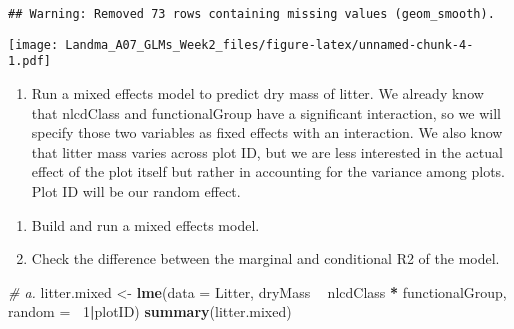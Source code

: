 \documentclass[]{article}
\newenvironment{Shaded}{\begin{snugshade}}{\end{snugshade}}
\newcommand{\CommentTok}[1]{\textcolor[rgb]{0.56,0.35,0.01}{\textit{#1}}}
\newcommand{\DataTypeTok}[1]{\textcolor[rgb]{0.13,0.29,0.53}{#1}}
\newcommand{\DecValTok}[1]{\textcolor[rgb]{0.00,0.00,0.81}{#1}}
\newcommand{\KeywordTok}[1]{\textcolor[rgb]{0.13,0.29,0.53}{\textbf{#1}}}
\newcommand{\NormalTok}[1]{#1}
\newcommand{\OperatorTok}[1]{\textcolor[rgb]{0.81,0.36,0.00}{\textbf{#1}}}
\newcommand{\StringTok}[1]{\textcolor[rgb]{0.31,0.60,0.02}{#1}}
\providecommand{\tightlist}{%
  \setlength{\itemsep}{0pt}\setlength{\parskip}{0pt}}
\begin{document}
\begin{verbatim}
## Warning: Removed 73 rows containing missing values (geom_smooth).
\end{verbatim}

\texttt{[image: Landma\_A07\_GLMs\_Week2\_files/figure-latex/unnamed-chunk-4-1.pdf]}

\begin{enumerate}
\def\labelenumi{\arabic{enumi}.}
\setcounter{enumi}{8}
\tightlist
\item
  Run a mixed effects model to predict dry mass of litter. We already
  know that nlcdClass and functionalGroup have a significant
  interaction, so we will specify those two variables as fixed effects
  with an interaction. We also know that litter mass varies across plot
  ID, but we are less interested in the actual effect of the plot itself
  but rather in accounting for the variance among plots. Plot ID will be
  our random effect.
\end{enumerate}

\begin{enumerate}
\def\labelenumi{\alph{enumi}.}
\tightlist
\item
  Build and run a mixed effects model.
\item
  Check the difference between the marginal and conditional R2 of the
  model.
\end{enumerate}

\begin{Shaded}
\begin{Highlighting}[]
\CommentTok{# a. }
\NormalTok{litter.mixed <-}\StringTok{ }\KeywordTok{lme}\NormalTok{(}\DataTypeTok{data =}\NormalTok{ Litter,}
\NormalTok{                     dryMass }\OperatorTok{~}\StringTok{ }\NormalTok{nlcdClass }\OperatorTok{*}\StringTok{ }\NormalTok{functionalGroup, }
                     \DataTypeTok{random =} \OperatorTok{~}\DecValTok{1}\OperatorTok{|}\NormalTok{plotID)}
\KeywordTok{summary}\NormalTok{(litter.mixed)}
\end{Highlighting}
\end{Shaded}
\end{document}
